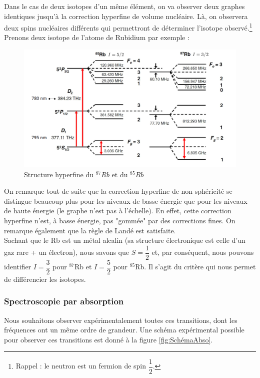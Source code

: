 Dans le cas de deux isotopes d'un même élément, on va observer deux graphes identiques jusqu'à la correction hyperfine de volume nucléaire. Là, on observera deux spins nucléaires différents qui permettront de déterminer l'isotope observé.\footnote{Rappel : le neutron est un fermion de spin $\dfrac{1}{2}$.} Prenons deux isotope de l'atome de Rubidium par exemple :
\begin{figure}[tph]
    \centering
    \includegraphics[scale=0.8]{Images2/ComparaisonRb.PNG}
    \caption{Structure hyperfine du $^{87}Rb$ et du $^{85}Rb$}
\label{eq:struct_hyperfine}
\end{figure}
On remarque tout de suite que la correction hyperfine de non-sphéricité se distingue beaucoup plus pour les niveaux de basse énergie que pour les niveaux de haute énergie (le graphe n'est pas à l'échelle). En effet, cette correction hyperfine n'est, à basse énergie, pas "gommée" par des corrections fines. On remarque également que la règle de Landé est satisfaite.\\
Sachant que le Rb est un métal alcalin (sa structure électronique est celle d'un gaz rare + un électron), nous savons que $S = \dfrac{1}{2}$ et, par conséquent, nous pouvons identifier $I = \dfrac{3}{2}$ pour $^{87}$Rb et $I = \dfrac{5}{2}$ pour $^{85}$Rb. Il s'agit du critère qui nous permet de différencier les isotopes.



\subsubsection{Spectroscopie par absorption}


Nous souhaitons observer expérimentalement toutes ces transitions, dont les fréquences ont un même ordre de grandeur. Une schéma expérimental possible pour observer ces transitions est donné à la figure \ref{fig:SchémaAbso}.

